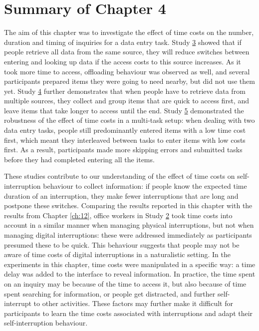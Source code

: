 \section{Summary of Chapter 4}
The aim of this chapter was to investigate the effect of time costs on the number, duration and timing of inquiries for a data entry task. Study \hyperref[st:Study3]{3} showed that if people retrieve all data from the same source, they will reduce switches between entering and looking up data if the access costs to this source increases. As it took more time to access, offloading behaviour was observed as well, and several participants prepared items they were going to need nearby, but did not use them yet. Study \hyperref[st:Study4]{4} further demonstrates that when people have to retrieve data from multiple sources, they collect and group items that are quick to access first, and leave items that take longer to access until the end. Study \hyperref[st:Study5]{5} demonstrated the robustness of the effect of time costs in a multi-task setup: when dealing with two data entry tasks, people still predominantly entered items with a low time cost first, which meant they interleaved between tasks to enter items with low costs first. As a result, participants made more skipping errors and submitted tasks before they had completed entering all the items. 

These studies contribute to our understanding of the effect of time costs on self-interruption behaviour to collect information: if people know the expected time duration of an interruption, they make fewer interruptions that are long and postpone these switches. Comparing the results reported in this chapter with the results from Chapter \ref{ch:12}, office workers in Study \hyperref[st:Study2]{2} took time costs into account in a similar manner when managing physical interruptions, but not when managing digital interruptions: these were addressed immediately as participants presumed these to be quick. This behaviour suggests that people may not be aware of time costs of digital interruptions in a naturalistic setting. In the experiments in this chapter, time costs were manipulated in a specific way: a time delay was added to the interface to reveal information. In practice, the time spent on an inquiry may be because of the time to access it, but also because of time spent searching for information, or people get distracted, and further self-interrupt to other activities. These factors may further make it difficult for participants to learn the time costs associated with interruptions and adapt their self-interruption behaviour. 

